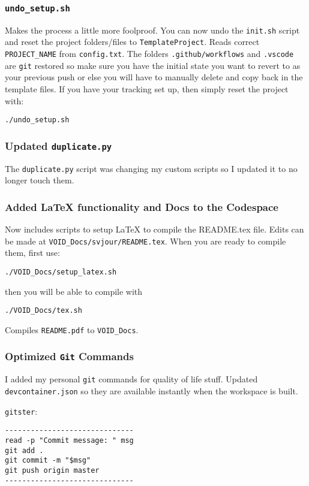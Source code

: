 \documentclass[twocolumn,natbib]{svjour3}        %
\begin{document}
\subsubsection{\protect\texttt{undo\_setup.sh}}
Makes the process a little more foolproof. You can now undo the \texttt{init.sh} script and reset the project folders/files to \texttt{TemplateProject}. Reads correct \texttt{PROJECT\_NAME} from \texttt{config.txt}. The folders \texttt{.github/workflows} and \texttt{.vscode} are \texttt{git} restored so make sure you have the initial state you want to revert to as your previous push or else you will have to manually delete and copy back in the template files. If you have your tracking set up, then simply reset the project with:
\begin{lstlisting}
./undo_setup.sh
\end{lstlisting}
\subsubsection{Updated \texttt{duplicate.py}}
The \texttt{duplicate.py} script was changing my custom scripts so I updated it to no longer touch them.

\subsubsection{Added LaTeX functionality and Docs to the Codespace}
Now includes scripts to setup LaTeX to compile the README.tex file. Edits can be made at \texttt{VOID\_Docs/svjour/README.tex}. When you are ready to compile them, first use:
\begin{lstlisting}
./VOID_Docs/setup_latex.sh
\end{lstlisting}
then you will be able to compile with
\begin{lstlisting}
./VOID_Docs/tex.sh
\end{lstlisting}
Compiles \texttt{README.pdf} to \texttt{VOID\_Docs}.
\subsubsection{Optimized \texttt{Git} Commands}
I added my personal \texttt{git} commands for quality of life stuff. Updated \texttt{devcontainer.json} so they are available instantly when the workspace is built.

\vspace{1em}

\texttt{gitster}:
\begin{verbatim}
------------------------------
read -p "Commit message: " msg
git add .
git commit -m "$msg"
git push origin master
------------------------------
\end{verbatim}
\end{document}
